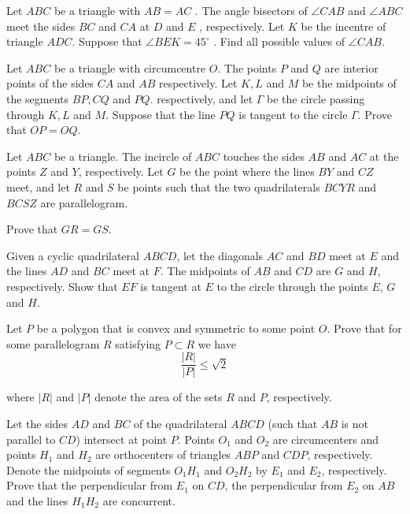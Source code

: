 \item[\textbf{G1.}]
Let 
$ ABC$
 be a triangle with 
$ AB = AC$
 . The angle bisectors of 
$ \angle C AB$
 and 
$ \angle AB C$
 meet the sides 
$ B C$
 and 
$ C A$
 at 
$ D$
 and 
$ E$
 , respectively. Let 
$ K$
 be the incentre of triangle 
$ ADC$.
 Suppose that 
$ \angle B E K = 45^\circ$
 . Find all possible values of 
$ \angle C AB$.

\item[\textbf{G2.}]
Let 
$ ABC$
 be a triangle with circumcentre 
$ O$.
 The points 
$ P$
 and 
$ Q$
 are interior points of the sides 
$ CA$
 and 
$ AB$
 respectively. Let 
$ K,L$
 and 
$ M$
 be the midpoints of the segments 
$ BP,CQ$
 and 
$ PQ$.
 respectively, and let 
$ \Gamma$
 be the circle passing through 
$ K,L$
 and 
$ M$.
 Suppose that the line 
$ PQ$
 is tangent to the circle 
$ \Gamma$.
 Prove that 
$ OP = OQ.$

\item[\textbf{G3.}]
Let 
$ABC$
 be a triangle. The incircle of 
$ABC$
 touches the sides 
$AB$
 and 
$AC$
 at the points 
$Z$
 and 
$Y$, 
 respectively. Let 
$G$
 be the point where the lines 
$BY$
 and 
$CZ$
 meet, and let 
$R$
 and 
$S$
 be points such that the two quadrilaterals 
$BCYR$
 and 
$BCSZ$
 are parallelogram.


Prove that 
$GR=GS$.

\item[\textbf{G4.}]
Given a cyclic quadrilateral 
$ABCD$, 
 let the diagonals 
$AC$
 and 
$BD$
 meet at 
$E$
 and the lines 
$AD$
 and 
$BC$
 meet at 
$F$.
 The midpoints of 
$AB$
 and 
$CD$
 are 
$G$
 and 
$H$, 
 respectively. Show that 
$EF$
 is tangent at 
$E$
 to the circle through the points 
$E$, 
$G$
 and 
$H$.

\item[\textbf{G5.}]
Let 
$P$
 be a polygon that is convex and symmetric to some point 
$O$.
 Prove that for some parallelogram 
$R$
 satisfying 
$P\subset R$
 we have 
\[\frac{|R|}{|P|}\leq \sqrt 2\]


where 
$|R|$
 and 
$|P|$
 denote the area of the sets 
$R$
 and 
$P$, 
 respectively.

\item[\textbf{G6.}]
Let the sides 
$AD$
 and 
$BC$
 of the quadrilateral 
$ABCD$
 (such that 
$AB$
 is not parallel to 
$CD$)
 intersect at point 
$P$.
 Points 
$O_1$
 and 
$O_2$
 are circumcenters and points 
$H_1$
 and 
$H_2$
 are orthocenters of triangles 
$ABP$
 and 
$CDP$, 
 respectively. Denote the midpoints of segments 
$O_1H_1$
 and 
$O_2H_2$
 by 
$E_1$
 and 
$E_2$, 
 respectively. Prove that the perpendicular from 
$E_1$
 on 
$CD$, 
 the perpendicular from 
$E_2$
 on 
$AB$
 and the lines 
$H_1H_2$
 are concurrent.

